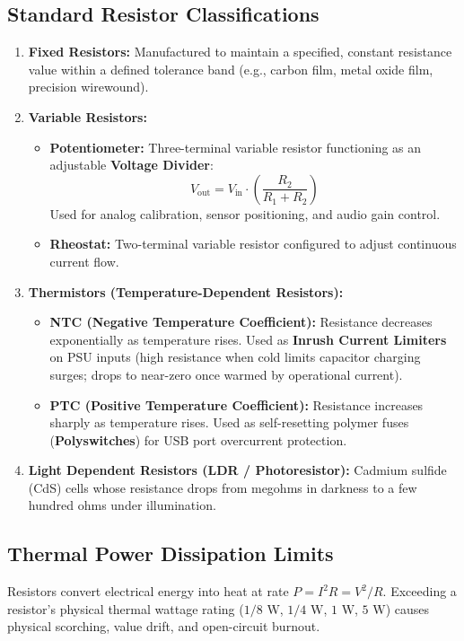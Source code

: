\subsection{Standard Resistor Classifications}
\begin{enumerate}[label=\bfseries\arabic*.]
    \item \textbf{Fixed Resistors:} Manufactured to maintain a specified, constant resistance value within a defined tolerance band (e.g., carbon film, metal oxide film, precision wirewound).
    \item \textbf{Variable Resistors:}
    \begin{itemize}
        \item \textbf{Potentiometer:} Three-terminal variable resistor functioning as an adjustable \textbf{Voltage Divider}:
        \[ V_{\text{out}} = V_{\text{in}} \cdot \left( \frac{R_2}{R_1 + R_2} \right) \]
        Used for analog calibration, sensor positioning, and audio gain control.
        \item \textbf{Rheostat:} Two-terminal variable resistor configured to adjust continuous current flow.
    \end{itemize}
    \item \textbf{Thermistors (Temperature-Dependent Resistors):}
    \begin{itemize}
        \item \textbf{NTC (Negative Temperature Coefficient):} Resistance decreases exponentially as temperature rises. Used as \textbf{Inrush Current Limiters} on PSU inputs (high resistance when cold limits capacitor charging surges; drops to near-zero once warmed by operational current).
        \item \textbf{PTC (Positive Temperature Coefficient):} Resistance increases sharply as temperature rises. Used as self-resetting polymer fuses (\textbf{Polyswitches}) for USB port overcurrent protection.
    \end{itemize}
    \item \textbf{Light Dependent Resistors (LDR / Photoresistor):} Cadmium sulfide (CdS) cells whose resistance drops from megohms in darkness to a few hundred ohms under illumination.
\end{enumerate}

\subsection{Thermal Power Dissipation Limits}
Resistors convert electrical energy into heat at rate $P = I^2 R = V^2 / R$. Exceeding a resistor's physical thermal wattage rating ($1/8\text{ W}$, $1/4\text{ W}$, $1\text{ W}$, $5\text{ W}$) causes physical scorching, value drift, and open-circuit burnout.



